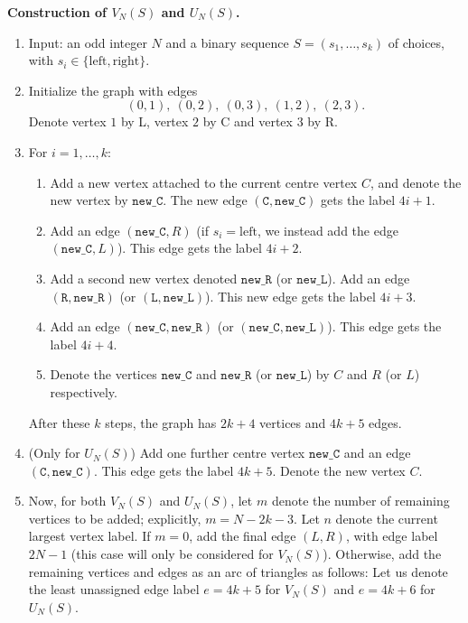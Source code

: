 \documentclass[11pt]{article}
\theoremstyle{definition}
\theoremstyle{plain}
\newcommand{\LeftChoice}{\mathrm{left}}
\newcommand{\RightChoice}{\mathrm{right}}
\begin{document}
\medskip
\noindent
\textbf{Construction of $V_N(S)$ and $U_N(S)$.}
\begin{enumerate}[itemsep=0.35em, topsep=0.35em]
\item Input: an odd integer $N$ and a binary sequence $S=(s_1,\dots,s_k)$ of choices, with $s_i \in \{\LeftChoice, \RightChoice\}$. 

\item \label{it:seed} Initialize the graph with edges
\[
(0,1),\ (0,2),\ (0,3),\ (1,2),\ (2,3). 
\]
Denote vertex $1$ by L, vertex $2$ by C and vertex $3$ by R.

\item \label{it:iterate} For $i=1,\dots,k$:
\begin{enumerate}[label=(\alph*), itemsep=0.25em, topsep=0.25em]
\item \label{it:spine} Add a new vertex attached to the current centre vertex $C$, and denote the new vertex by $\texttt{new\_C}$. The new edge $(\texttt{C},\texttt{new\_C})$ gets the label $4i+1$. 

\item \label{it:triangle1} Add an edge $(\texttt{new\_C},R)$ (if $s_i=\LeftChoice$, we instead add the edge $(\texttt{new\_C},L)$). This edge gets the label $4i+2$.
\item \label{it:triangle2} Add a second new vertex denoted $\texttt{new\_R}$ (or $\texttt{new\_L}$). Add an edge $(\texttt{R},\texttt{new\_R})$ (or $(\texttt{L},\texttt{new\_L})$). This new edge gets the label $4i+3$.
\item \label{it:triangle3} Add an edge $(\texttt{new\_C},\texttt{new\_R})$ (or $(\texttt{new\_C},\texttt{new\_L})$). This edge gets the label $4i+4$.
\item Denote the vertices $\texttt{new\_C}$ and $\texttt{new\_R}$ (or $\texttt{new\_L}$) by $C$ and $R$ (or $L$) respectively. 

\end{enumerate}

After these $k$ steps, the graph has $2k+4$ vertices and $4k+5$ edges.  

\item \label{it:U}(Only for $U_N(S)$) 
Add one further centre vertex $\texttt{new\_C}$ and an edge $(\texttt{C},\texttt{new\_C})$. This edge gets the label $4k+5$.
Denote the new vertex $C$.

\item \label{it:arc} 
Now, for both $V_N(S)$ and $U_N(S)$, let $m$ denote the number of remaining vertices to be added; explicitly, $m=N-2k-3$. Let $n$ denote the current largest vertex label.
If $m = 0$, add the final edge $(L,R)$, with edge label $2N-1$ (this case will only be considered for $V_N(S)$). 
Otherwise, add the remaining vertices and edges as an arc of triangles as follows: 
Let us denote the least unassigned edge label $e = 4k+5$ for $V_N(S)$ and $e = 4k+6$ for $U_N(S)$.


\end{enumerate}
\end{document}
